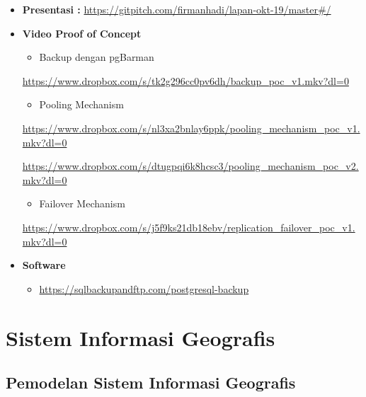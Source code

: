 \documentclass[]{book}
\providecommand{\tightlist}{%
  \setlength{\itemsep}{0pt}\setlength{\parskip}{0pt}}
\begin{document}
\begin{itemize}
\item
  \textbf{Presentasi :}
  \href{https://gitpitch.com/firmanhadi/lapan-okt-19/master/}{https://gitpitch.com/firmanhadi/lapan-okt-19/master\#/}
\item
  \textbf{Video Proof of Concept}

  \begin{itemize}
  \tightlist
  \item
    Backup dengan pgBarman
  \end{itemize}

  \url{https://www.dropbox.com/s/tk2g296cc0pv6dh/backup_poc_v1.mkv?dl=0}

  \begin{itemize}
  \tightlist
  \item
    Pooling Mechanism
  \end{itemize}

  \url{https://www.dropbox.com/s/nl3xa2bnlay6ppk/pooling_mechanism_poc_v1.mkv?dl=0}

  \url{https://www.dropbox.com/s/dtugpqi6k8hcsc3/pooling_mechanism_poc_v2.mkv?dl=0}

  \begin{itemize}
  \tightlist
  \item
    Failover Mechanism
  \end{itemize}

  \url{https://www.dropbox.com/s/j5f9ks21db18ebv/replication_failover_poc_v1.mkv?dl=0}
\item
  \textbf{Software}

  \begin{itemize}
  \tightlist
  \item
    \url{https://sqlbackupandftp.com/postgresql-backup}
  \end{itemize}
\end{itemize}

\hypertarget{part-sistem-informasi-geografis}{%
\part{Sistem Informasi Geografis}\label{part-sistem-informasi-geografis}}

\hypertarget{pemodelan-sistem-informasi-geografis}{%
\chapter{Pemodelan Sistem Informasi Geografis}\label{pemodelan-sistem-informasi-geografis}}
\end{document}
